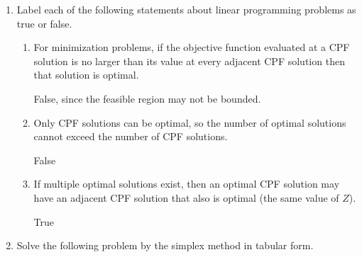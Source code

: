 \documentclass[a4paper]{article}
\begin{document}
\courseheader
{}

\begin{enumerate}
  \setlength{\itemsep}{3\parskip}

  \item Label each of the following statements about linear programming problems as true or false.
  \begin{enumerate}
  	\item  For minimization problems, if the objective function evaluated at a CPF solution is no larger than its value at every adjacent CPF solution then that solution is optimal.
  	\begin{solution}
  			False, since the feasible region may not be bounded.
  	\end{solution}
  	
  	\item Only CPF solutions can be optimal, so the number of optimal solutions cannot exceed the number of CPF solutions.
  	\begin{solution}
  	False
  	\end{solution}  	
  	
  	\item If multiple optimal solutions exist, then an optimal CPF solution may have an adjacent CPF solution that also is optimal (the same value of $Z$).
  	\begin{solution}
  		True
  	\end{solution}
  	
  \end{enumerate}
  

  \item Solve the following problem by the simplex method in tabular form.
  

\end{enumerate}
\end{document}
